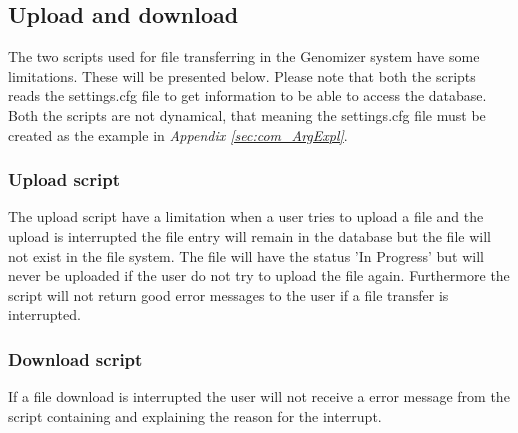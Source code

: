 \subsection{Upload and download}
The two scripts used for file transferring in the Genomizer system have some limitations. These will be presented below. Please note that both the scripts reads the settings.cfg file to get information to be able to access the database. Both the scripts are not dynamical, that meaning the settings.cfg file must be created as the example in \emph{Appendix \ref{sec:com_ArgExpl}}.
\subsubsection{Upload script}
The upload script have a limitation when a user tries to upload a file and the upload is interrupted the file entry will remain in the database but the file will not exist in the file system. The file will have the status 'In Progress' but will never be uploaded if the user do not try to upload the file again. Furthermore the script will not return good error messages to the user if a file transfer is interrupted. 
\subsubsection{Download script}
If a file download is interrupted the user will not receive a error message from the script containing and explaining the reason for the interrupt. 


